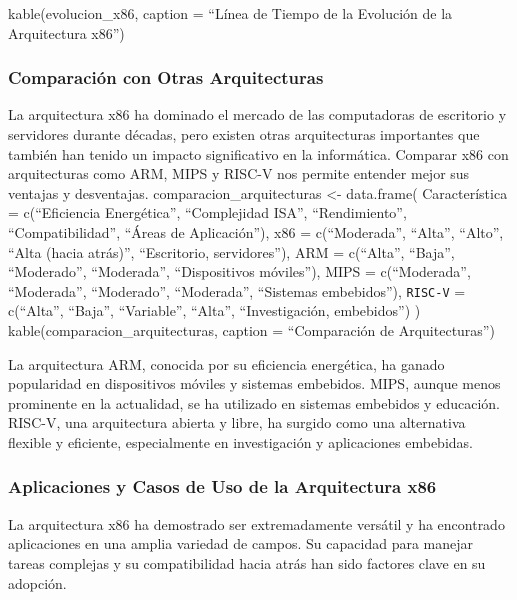 \documentclass[12pt,twoside]{templates/unerthesis}
\begin{document}
kable(evolucion\_x86, caption = ``Línea de Tiempo de la Evolución de la Arquitectura x86'')

\hypertarget{comparaciuxf3n-con-otras-arquitecturas}{%
\subsubsection{Comparación con Otras Arquitecturas}\label{comparaciuxf3n-con-otras-arquitecturas}}

La arquitectura x86 ha dominado el mercado de las computadoras de escritorio y servidores durante décadas, pero existen otras arquitecturas importantes que también han tenido un impacto significativo en la informática. Comparar x86 con arquitecturas como ARM, MIPS y RISC-V nos permite entender mejor sus ventajas y desventajas.
comparacion\_arquitecturas \textless{}- data.frame(
Característica = c(``Eficiencia Energética'', ``Complejidad ISA'', ``Rendimiento'', ``Compatibilidad'', ``Áreas de Aplicación''),
x86 = c(``Moderada'', ``Alta'', ``Alto'', ``Alta (hacia atrás)'', ``Escritorio, servidores''),
ARM = c(``Alta'', ``Baja'', ``Moderado'', ``Moderada'', ``Dispositivos móviles''),
MIPS = c(``Moderada'', ``Moderada'', ``Moderado'', ``Moderada'', ``Sistemas embebidos''),
\texttt{RISC-V} = c(``Alta'', ``Baja'', ``Variable'', ``Alta'', ``Investigación, embebidos'')
)
kable(comparacion\_arquitecturas, caption = ``Comparación de Arquitecturas'')

La arquitectura ARM, conocida por su eficiencia energética, ha ganado popularidad en dispositivos móviles y sistemas embebidos. MIPS, aunque menos prominente en la actualidad, se ha utilizado en sistemas embebidos y educación. RISC-V, una arquitectura abierta y libre, ha surgido como una alternativa flexible y eficiente, especialmente en investigación y aplicaciones embebidas.

\hypertarget{aplicaciones-y-casos-de-uso-de-la-arquitectura-x86}{%
\subsubsection{Aplicaciones y Casos de Uso de la Arquitectura x86}\label{aplicaciones-y-casos-de-uso-de-la-arquitectura-x86}}

La arquitectura x86 ha demostrado ser extremadamente versátil y ha encontrado aplicaciones en una amplia variedad de campos. Su capacidad para manejar tareas complejas y su compatibilidad hacia atrás han sido factores clave en su adopción.
\end{document}
